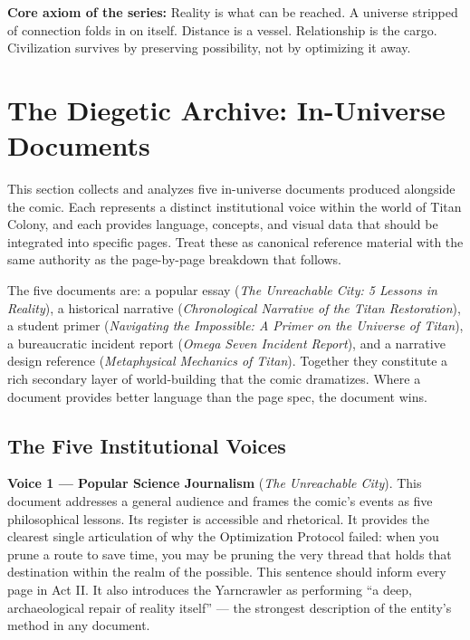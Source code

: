\documentclass[11pt]{article}
\begin{document}
\begin{warnbox}
\noindent\textbf{Core axiom of the series:} Reality is what can be reached. A universe stripped of connection folds in on itself. Distance is a vessel. Relationship is the cargo. Civilization survives by preserving possibility, not by optimizing it away.
\end{warnbox}

\section{The Diegetic Archive: In-Universe Documents}

This section collects and analyzes five in-universe documents produced alongside the comic. Each represents a distinct institutional voice within the world of Titan Colony, and each provides language, concepts, and visual data that should be integrated into specific pages. Treat these as canonical reference material with the same authority as the page-by-page breakdown that follows.

The five documents are: a popular essay (\textit{The Unreachable City: 5 Lessons in Reality}), a historical narrative (\textit{Chronological Narrative of the Titan Restoration}), a student primer (\textit{Navigating the Impossible: A Primer on the Universe of Titan}), a bureaucratic incident report (\textit{Omega Seven Incident Report}), and a narrative design reference (\textit{Metaphysical Mechanics of Titan}). Together they constitute a rich secondary layer of world-building that the comic dramatizes. Where a document provides better language than the page spec, the document wins.

\subsection{The Five Institutional Voices}

\textbf{Voice 1 --- Popular Science Journalism} (\textit{The Unreachable City}).
This document addresses a general audience and frames the comic's events as five philosophical lessons. Its register is accessible and rhetorical. It provides the clearest single articulation of why the Optimization Protocol failed: when you prune a route to save time, you may be pruning the very thread that holds that destination within the realm of the possible. This sentence should inform every page in Act II. It also introduces the Yarncrawler as performing ``a deep, archaeological repair of reality itself'' --- the strongest description of the entity's method in any document.
\end{document}
